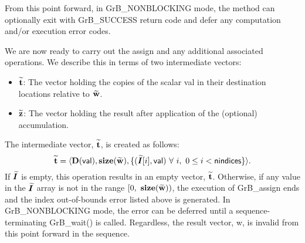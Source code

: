 From this point forward, in {\sf GrB\_NONBLOCKING} mode, the method can 
optionally exit with {\sf GrB\_SUCCESS} return code and defer any computation 
and/or execution error codes.

We are now ready to carry out the assign and any additional 
associated operations.  We describe this in terms of two intermediate vectors:
\begin{itemize}
    \item ${\bf \widetilde{t}}$: The vector holding the copies of the scalar 
    {\sf val} in their destination locations relative to 
    ${\bf \widetilde{w}}$.
    
    \item ${\bf \widetilde{z}}$: The vector holding the result after 
    application of the (optional) accumulation.
\end{itemize}

The intermediate vector, ${\bf \widetilde{t}}$, is created as follows:
\[
{\bf \widetilde{t}} = \langle
\bold{D}({\sf val}), \bold{size}({\bf \widetilde{w}}),
\{(\bm{\widetilde{I}}[i],{\sf val})\ \forall \ i,\ 0 \leq i < {\sf nindices} \} \rangle. 
\]
If $\bm{\widetilde{I}}$ is empty, this operation results in an empty 
vector, ${\bf \widetilde{t}}$.  Otherwise, if any value in the 
$\bm{\widetilde{I}}$ array is not in the range 
$[0,\ \bold{size}({\bf \widetilde{w}}) )$, the execution of {\sf GrB\_assign} 
ends and the index out-of-bounds error listed above is generated. In 
{\sf GrB\_NONBLOCKING} mode, the error can be deferred until a 
sequence-terminating {\sf GrB\_wait()} is called.  Regardless, the result 
vector, {\sf w}, is invalid from this point forward in the 
sequence.


